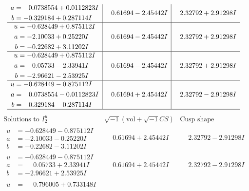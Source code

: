 \documentclass[1p]{elsarticle_modified}
\theoremstyle{definition}
\newcommand{\I}{\sqrt{-1}}
\begin{document}
$$\begin{array}{c|c|c}
\begin{aligned}
a &= \phantom{-}0.0738554 + 0.0112823 I \\
b &= -0.329184 + 0.287114 I\end{aligned}
 & \phantom{-}0.61694 - 2.45442 I & \phantom{-}2.32792 + 2.91298 I \\ \hline\begin{aligned}
u &= -0.628449 + 0.875112 I \\
a &= -2.10033 + 0.25220 I \\
b &= -0.22682 + 3.11202 I\end{aligned}
 & \phantom{-}0.61694 - 2.45442 I & \phantom{-}2.32792 + 2.91298 I \\ \hline\begin{aligned}
u &= -0.628449 + 0.875112 I \\
a &= \phantom{-}0.05733 - 2.33941 I \\
b &= -2.96621 - 2.53925 I\end{aligned}
 & \phantom{-}0.61694 - 2.45442 I & \phantom{-}2.32792 + 2.91298 I \\ \hline\begin{aligned}
u &= -0.628449 - 0.875112 I \\
a &= \phantom{-}0.0738554 - 0.0112823 I \\
b &= -0.329184 - 0.287114 I\end{aligned}
 & \phantom{-}0.61694 + 2.45442 I & \phantom{-}2.32792 - 2.91298 I\\
 \hline 
 \end{array}$$\newpage$$\begin{array}{c|c|c}  
\text{Solutions to }I^u_{2}& \I (\text{vol} + \sqrt{-1}CS) & \text{Cusp shape}\\
 \hline 
\begin{aligned}
u &= -0.628449 - 0.875112 I \\
a &= -2.10033 - 0.25220 I \\
b &= -0.22682 - 3.11202 I\end{aligned}
 & \phantom{-}0.61694 + 2.45442 I & \phantom{-}2.32792 - 2.91298 I \\ \hline\begin{aligned}
u &= -0.628449 - 0.875112 I \\
a &= \phantom{-}0.05733 + 2.33941 I \\
b &= -2.96621 + 2.53925 I\end{aligned}
 & \phantom{-}0.61694 + 2.45442 I & \phantom{-}2.32792 - 2.91298 I \\ \hline\begin{aligned}
u &= \phantom{-}0.796005 + 0.733148 I \\

\end{aligned}
\end{array}$$
\end{document}
